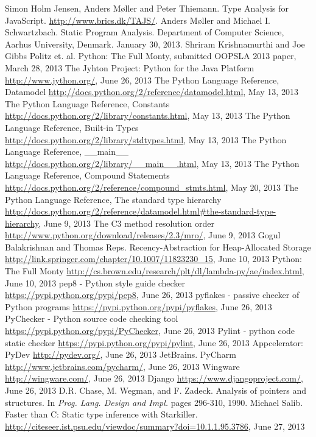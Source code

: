 \begin{thebibliography}{8}

 Simon Holm Jensen, Anders M\o ller and Peter Thiemann. Type Analysis for JavaScript. \url{http://www.brics.dk/TAJS/}.
 Anders M\o ller and Michael I. Schwartzbach. Static Program Analysis. Department of Computer Science, Aarhus University, Denmark. January 30, 2013.
 Shriram Krishnamurthi and Joe Gibbs Politz et. al. Python: The Full Monty, submitted OOPSLA 2013 paper, March 28, 2013
 The Jyhton Project: Python for the Java Platform \url{http://www.jython.org/}, June 26, 2013
 The Python Language Reference, Datamodel \url{http://docs.python.org/2/reference/datamodel.html}, May 13, 2013
 The Python Language Reference, Constants \url{http://docs.python.org/2/library/constants.html}, May 13, 2013
 The Python Language Reference, Built-in Types \url{http://docs.python.org/2/library/stdtypes.html}, May 13, 2013
 The Python Language Reference, \_\_main\_\_ \url{http://docs.python.org/2/library/__main__.html}, May 13, 2013
 The Python Language Reference, Compound Statements \url{http://docs.python.org/2/reference/compound_stmts.html}, May 20, 2013
 The Python Language Reference, The standard type hierarchy \url{http://docs.python.org/2/reference/datamodel.html#the-standard-type-hierarchy}, June 9, 2013
 The C3 method resolution order \url{http://www.python.org/download/releases/2.3/mro/}, June 9, 2013
 Gogul Balakrishnan and Thomas Reps. Recency-Abstraction for Heap-Allocated Storage \url{http://link.springer.com/chapter/10.1007/11823230_15}, June 10, 2013
 Python: The Full Monty \url{http://cs.brown.edu/research/plt/dl/lambda-py/ae/index.html}, June 10, 2013
 pep8 - Python style guide checker \url{https://pypi.python.org/pypi/pep8}, June 26, 2013
 pyflakes - passive checker of Python programs \url{https://pypi.python.org/pypi/pyflakes}, June 26, 2013
 PyChecker - Python source code checking tool \url{https://pypi.python.org/pypi/PyChecker}, June 26, 2013
 Pylint - python code static checker \url{https://pypi.python.org/pypi/pylint}, June 26, 2013
 Appcelerator: PyDev \url{http://pydev.org/}, June 26, 2013
 JetBrains. PyCharm \url{http://www.jetbrains.com/pycharm/}, June 26, 2013
 Wingware \url{http://wingware.com/}, June 26, 2013
 Django \url{https://www.djangoproject.com/}, June 26, 2013
 D.R. Chase, M. Wegman, and F. Zadeck. Analysis of pointers and structures. In \textit{Prog. Lang. Design and Impl.} pages 296-310, 1990.
 Michael Salib. Faster than C: Static type inference with Starkiller. \url{http://citeseer.ist.psu.edu/viewdoc/summary?doi=10.1.1.95.3786}, June 27, 2013
\end{thebibliography}
